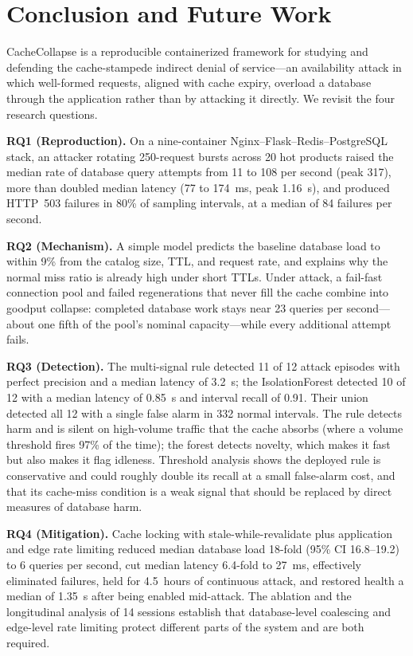 \documentclass[preprint,12pt]{elsarticle}
\begin{document}
\section{Conclusion and Future Work}
\label{sec:conclusion}

CacheCollapse is a reproducible containerized framework for studying and defending
the cache-stampede indirect denial of service---an availability attack in which
well-formed requests, aligned with cache expiry, overload a database through the
application rather than by attacking it directly. We revisit the four research
questions.

\textbf{RQ1 (Reproduction).} On a nine-container Nginx--Flask--Redis--PostgreSQL stack,
an attacker rotating 250-request bursts across 20 hot products raised the median rate
of database query attempts from 11 to 108 per second (peak 317), more than doubled
median latency (77 to 174~ms, peak 1.16~s), and produced HTTP~503 failures in 80\% of
sampling intervals, at a median of 84 failures per second.

\textbf{RQ2 (Mechanism).} A simple model predicts the baseline database load to within
9\% from the catalog size, TTL, and request rate, and explains why the normal miss
ratio is already high under short TTLs. Under attack, a fail-fast connection pool and
failed regenerations that never fill the cache combine into goodput collapse:
completed database work stays near 23 queries per second---about one fifth of the
pool's nominal capacity---while every additional attempt fails.

\textbf{RQ3 (Detection).} The multi-signal rule detected 11 of 12 attack episodes with
perfect precision and a median latency of 3.2~s; the IsolationForest detected 10 of 12
with a median latency of 0.85~s and interval recall of 0.91. Their union detected all
12 with a single false alarm in 332 normal intervals. The rule detects harm and is
silent on high-volume traffic that the cache absorbs (where a volume threshold fires
97\% of the time); the forest detects novelty, which makes it fast but also makes it
flag idleness. Threshold analysis shows the deployed rule is conservative and could
roughly double its recall at a small false-alarm cost, and that its cache-miss
condition is a weak signal that should be replaced by direct measures of database
harm.

\textbf{RQ4 (Mitigation).} Cache locking with stale-while-revalidate plus application
and edge rate limiting reduced median database load 18-fold (95\% CI 16.8--19.2) to
6 queries per second, cut median latency 6.4-fold to 27~ms, effectively eliminated
failures, held for 4.5~hours of continuous attack, and restored health a median of
1.35~s after being enabled mid-attack. The ablation and the longitudinal analysis of
14 sessions establish that database-level coalescing and edge-level rate limiting
protect different parts of the system and are both required.
\end{document}
